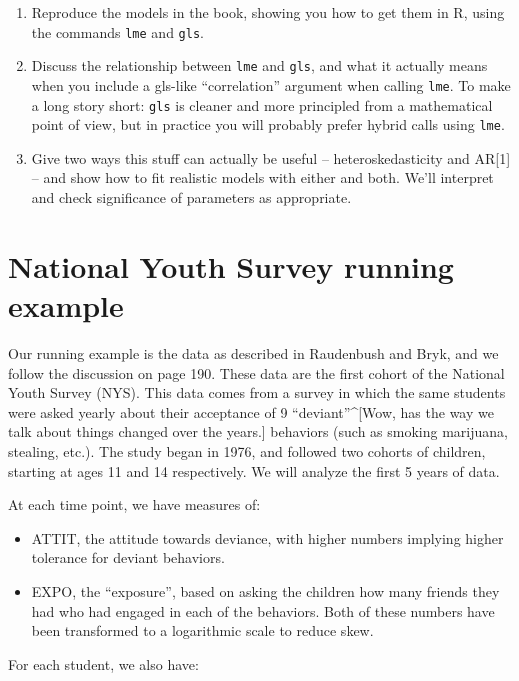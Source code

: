 \documentclass[
  letterpaper,
  DIV=11,
  numbers=noendperiod]{scrreprt}
\providecommand{\tightlist}{%
  \setlength{\itemsep}{0pt}\setlength{\parskip}{0pt}}\usepackage{longtable,booktabs,array}
\begin{document}
\begin{enumerate}
\def\labelenumi{\arabic{enumi}.}
\item
  Reproduce the models in the book, showing you how to get them in R,
  using the commands \texttt{lme} and \texttt{gls}.
\item
  Discuss the relationship between \texttt{lme} and \texttt{gls}, and
  what it actually means when you include a gls-like ``correlation''
  argument when calling \texttt{lme}. To make a long story short:
  \texttt{gls} is cleaner and more principled from a mathematical point
  of view, but in practice you will probably prefer hybrid calls using
  \texttt{lme}.
\item
  Give two ways this stuff can actually be useful -- heteroskedasticity
  and AR{[}1{]} -- and show how to fit realistic models with either and
  both. We'll interpret and check significance of parameters as
  appropriate.
\end{enumerate}

\section{National Youth Survey running
example}\label{national-youth-survey-running-example}

Our running example is the data as described in Raudenbush and Bryk, and
we follow the discussion on page 190. These data are the first cohort of
the National Youth Survey (NYS). This data comes from a survey in which
the same students were asked yearly about their acceptance of 9
``deviant''\^{}{[}Wow, has the way we talk about things changed over the
years.{]} behaviors (such as smoking marijuana, stealing, etc.). The
study began in 1976, and followed two cohorts of children, starting at
ages 11 and 14 respectively. We will analyze the first 5 years of data.

At each time point, we have measures of:

\begin{itemize}
\tightlist
\item
  ATTIT, the attitude towards deviance, with higher numbers implying
  higher tolerance for deviant behaviors.
\item
  EXPO, the ``exposure'', based on asking the children how many friends
  they had who had engaged in each of the behaviors. Both of these
  numbers have been transformed to a logarithmic scale to reduce skew.
\end{itemize}

For each student, we also have:
\end{document}
